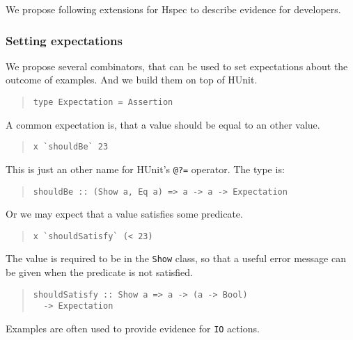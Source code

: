 \documentclass[preprint]{sigplanconf}
\begin{document}
We propose following extensions for Hspec to
describe evidence for developers.

\subsubsection{Setting expectations}

We propose several combinators, that can be used to set expectations
about the outcome of examples.  And we build them on top of
HUnit.

\begin{quote}\small\begin{verbatim}
type Expectation = Assertion
\end{verbatim}\end{quote}

\noindent A common expectation is, that a value should be equal to an other
value.

\begin{quote}\small\begin{verbatim}
x `shouldBe` 23
\end{verbatim}\end{quote}

\noindent This is just an other name for HUnit's \texttt{@?=}
operator.  The type is:

\begin{quote}\small\begin{verbatim}
shouldBe :: (Show a, Eq a) => a -> a -> Expectation
\end{verbatim}\end{quote}

\noindent Or we may expect that a value satisfies some predicate.

\begin{quote}\small\begin{verbatim}
x `shouldSatisfy` (< 23)
\end{verbatim}\end{quote}

\noindent The value is required to be in the \texttt{Show} class, so that a
useful error message can be given when the predicate is not satisfied.

\begin{quote}\small\begin{verbatim}
shouldSatisfy :: Show a => a -> (a -> Bool)
  -> Expectation
\end{verbatim}\end{quote}

\noindent Examples are often used to provide evidence for {\tt IO}
actions.
\end{document}
